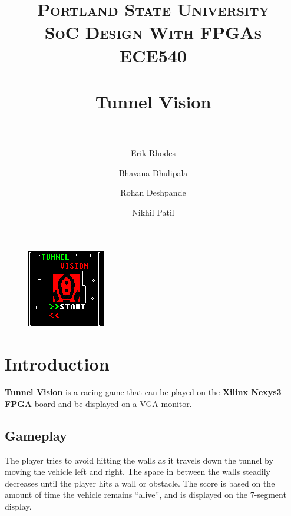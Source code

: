 \documentclass[11pt]{article}
\title{	
\normalfont \normalsize 
\textsc{\LARGE Portland State University}\\[1.5cm] %
\textsc{\Large SoC Design With FPGAs}\\[0.5cm] %
\textsc{\large ECE540}\\[0.5cm] %
\horrule{1.2pt} \\[0.4cm] %
\huge Tunnel Vision \\ %
\horrule{1.2pt} \\[0.5cm] %
}
\begin{document}
\raggedright
\author{Erik Rhodes \and Bhavana Dhulipala \and Rohan Deshpande \and Nikhil Patil} %
\maketitle %
\thispagestyle{empty}


\begin{figure}[h]\centering
\includegraphics[height=0.65\textwidth]{Images/start.png}
		\label{start}
	\end{figure}

\tableofcontents
\newpage


\section{Introduction} 
\textbf{Tunnel Vision} is a racing game that can be played on the \textbf{Xilinx Nexys3 FPGA} board and be displayed on a VGA monitor.

\subsection{Gameplay}
The player tries to avoid hitting the walls as it travels down the tunnel by moving the vehicle left and right. The space in between the walls steadily decreases until the player hits a wall or obstacle. The score is based on the amount of time the vehicle remains ``alive'', and is displayed on the 7-segment display.
\end{document}

